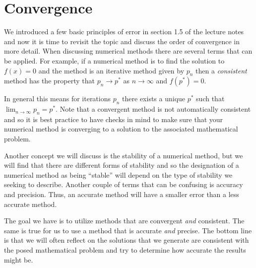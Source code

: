 \documentclass[twoside]{article}
\def\ds{\displaystyle}
\begin{document}
\section{Convergence} 
We introduced a few basic principles of error in section 1.5 of the lecture notes and now it is time to revisit the topic and discuss the order of convergence in more detail. When discussing numerical methods there are several terms that can be applied. 
 For example, if a numerical method is to find the solution to $\ds f(x) = 0$ and the method is an iterative method given by $\ds p_n$ then a {\it consistent} method has the property that $\ds p_n\rightarrow p^*$ as $n \rightarrow \infty$ and $\ds f(p^*)=0$. 

 In general this means for iterations $p_n$ there exists a unique $p^*$ such that $\ds \lim_{n \rightarrow \infty}p_n =p^*$. {\color{teal} Note that a convergent method is not automatically consistent and so it is best practice to have checks in mind to make sure that your numerical method is converging to a solution to the associated mathematical problem.}

Another concept we will discuss is the stability of a numerical method, but we will find that there are different forms of stability and so the designation of a numerical method as being ``stable'' will depend on the type of stability we seeking to describe. Another couple of terms that can be confusing is accuracy and precision. 
 Thus, an accurate method will have a smaller error than a less accurate method. 

The goal we have is to utilize methods that are convergent {\it and} consistent. The same is true for us to use a method that is accurate {\it and} precise. The bottom line is that we will often reflect on the solutions that we generate are consistent with the posed mathematical problem and try to determine how accurate the results might be. 
\end{document}
